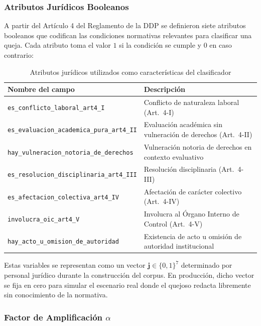 \subsubsection{Atributos Jurídicos Booleanos}

A partir del Artículo 4 del Reglamento de la DDP se definieron siete atributos 
booleanos que codifican las condiciones normativas relevantes para clasificar una 
queja. Cada atributo toma el valor $1$ si la condición se cumple y $0$ en caso 
contrario:

\begin{table}[H]
\centering
\caption{Atributos jurídicos utilizados como características del clasificador}
\label{tab:campos_juridicos}
\begin{tabularx}{\textwidth}{lL}
\toprule
\textbf{Nombre del campo} & \textbf{Descripción} \\
\midrule
\texttt{es\_conflicto\_laboral\_art4\_I}
  & Conflicto de naturaleza laboral (Art.~4-I) \\
\texttt{es\_evaluacion\_academica\_pura\_art4\_II}
  & Evaluación académica sin vulneración de derechos (Art.~4-II) \\
\texttt{hay\_vulneracion\_notoria\_de\_derechos}
  & Vulneración notoria de derechos en contexto evaluativo \\
\texttt{es\_resolucion\_disciplinaria\_art4\_III}
  & Resolución disciplinaria (Art.~4-III) \\
\texttt{es\_afectacion\_colectiva\_art4\_IV}
  & Afectación de carácter colectivo (Art.~4-IV) \\
\texttt{involucra\_oic\_art4\_V}
  & Involucra al Órgano Interno de Control (Art.~4-V) \\
\texttt{hay\_acto\_u\_omision\_de\_autoridad}
  & Existencia de acto u omisión de autoridad institucional \\
\bottomrule
\end{tabularx}
\end{table}

Estas variables se representan como un vector $\mathbf{j} \in \{0,1\}^7$ 
determinado por personal jurídico durante la construcción del corpus. En 
producción, dicho vector se fija en cero para simular el escenario real donde 
el quejoso redacta libremente sin conocimiento de la normativa.

\subsubsection{Factor de Amplificación $\alpha$}

